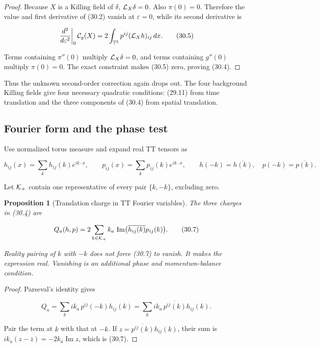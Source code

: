 \documentclass[11pt]{article}
\newtheorem{proposition}[theorem]{Proposition}
\theoremstyle{remark}
\begin{document}
\begin{proof}
Because \(X\) is a Killing field of \(\delta\),
\({\cal L}_X\delta=0\).  Also \(\pi(0)=0\).  Therefore the value and first
derivative of (30.2) vanish at \(\varepsilon=0\), while its second
derivative is

\[
 \left.\frac{d^2}{d\varepsilon^2}\right|_0{\cal C}_g(X)
 =2\int_{\mathbb T^3}p^{ij}({\cal L}_Xh)_{ij}\,dx.             \tag{30.5}
\]

Terms containing \(\pi''(0)\) multiply
\({\cal L}_X\delta=0\), and terms containing \(g''(0)\) multiply
\(\pi(0)=0\).  The exact constraint makes (30.5) zero, proving (30.4).
\end{proof}

Thus the unknown second-order correction again drops out.  The four
background Killing fields give four necessary quadratic conditions:
(29.11) from time translation and the three components of (30.4) from
spatial translation.

\subsection{Fourier form and the phase test}

Use normalized torus measure and expand real TT tensors as

\[
 h_{ij}(x)=\sum_k h_{ij}(k)e^{ik\cdot x},\qquad
 p_{ij}(x)=\sum_k p_{ij}(k)e^{ik\cdot x},\qquad
 h(-k)=\overline{h(k)},\quad p(-k)=\overline{p(k)}.            \tag{30.6}
\]

Let \({\cal K}_+\) contain one representative of every pair
\(\{k,-k\}\), excluding zero.

\begin{proposition}[Translation charge in TT Fourier variables]
\label{prop:v19v27-fourier}
The three charges in (30.4) are

\[
 Q_a(h,p)
 =2\sum_{k\in{\cal K}_+}k_a\,
 \operatorname{Im}\bigl(
 \overline{h_{ij}(k)}p_{ij}(k)\bigr).                          \tag{30.7}
\]

Reality pairing of \(k\) with \(-k\) does not force (30.7) to vanish.
It makes the expression real.  Vanishing is an additional phase and
momentum-balance condition.
\end{proposition}

\begin{proof}
Parseval's identity gives

\[
 Q_a
 =\sum_k i k_a\,p^{ij}(-k)h_{ij}(k)
 =\sum_k i k_a\,\overline{p^{ij}(k)}h_{ij}(k).                 \tag{30.8}
\]

Pair the term at \(k\) with that at \(-k\).  If
\(z=\overline{p^{ij}(k)}h_{ij}(k)\), their sum is
\(ik_a(z-\overline z)=-2k_a\operatorname{Im}z\), which is
(30.7).
\end{proof}
\end{document}
